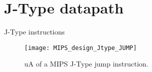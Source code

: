 \documentclass[]{slides}
\begin{document}
\section{J-Type datapath}
% 
\begin{frame}{J-Type instructions}
  \begin{figure}
  \centering
  \texttt{[image: MIPS\_design\_Jtype\_JUMP]}
  \vspace{-3pt}
  \caption{\ac{uA} of a \ac{MIPS} J-Type jump instruction.}
  \label{Figure:non_pipelined_MIPS_Jtype_JUMP}
  \end{figure}
\end{frame}
\end{document}
